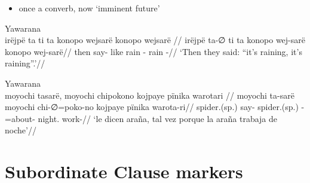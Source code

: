 \documentclass{memoir}
\begin{document}
\begin{itemize}
\tightlist
\item
  once a converb, now `imminent future'
\end{itemize}

\ex Yawarana \\
\label{ctorat-25}    \begingl
    \glpreamble irëjpë ta ti ta konopo wejsarë konopo wejsarë //
    \gla irëjpë ta-∅ ti ta konopo wej-sarë konopo wej-sarë//
    \glb then say-  like rain - rain -//
        \glft ‘Then they said: “it’s raining, it’s raining”.’//  
    \endgl 
\xe

\ex Yawarana \\
\label{ctoaragrme-25}    \begingl
    \glpreamble moyochi tasarë, moyochi chipokono kojpaye pïnika warotari //
    \gla moyochi ta-sarë moyochi chi-∅=poko-no kojpaye pïnika warota-ri//
    \glb spider.(sp.) say- spider.(sp.) -=about- night.  work-//
        \glft ‘le dicen araña, tal vez porque la araña trabaja de noche’//  
    \endgl 
\xe

\section{Subordinate Clause markers}

\end{document}

